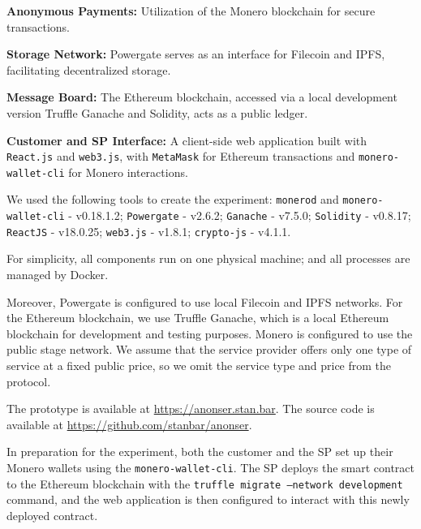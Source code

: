 \documentclass[pdftex,twocolumn,epjc3]{svjour3}
\begin{document}
\begin{itemize}
\begin{sloppypar}
  \item \textbf{Anonymous Payments:} Utilization of the Monero blockchain for secure transactions.
\end{sloppypar}
  \item \textbf{Storage Network:} Powergate serves as an interface for Filecoin and IPFS, facilitating decentralized storage.
  \item \textbf{Message Board:} The Ethereum blockchain, accessed via a local development version Truffle Ganache and Solidity, acts as a public ledger.
  \item \textbf{Customer and SP Interface:} A client-side web application built with \texttt{React.js} and \texttt{web3.js}, with \texttt{MetaMask} for Ethereum transactions and \texttt{monero-wallet-cli} for Monero interactions.
\end{itemize}

We used the following tools to create the experiment:
\texttt{monerod} and \texttt{monero-wallet-cli} - v0.18.1.2; \texttt{Powergate} - v2.6.2; \texttt{Ganache} - v7.5.0; \texttt{Solidity} - v0.8.17; \texttt{ReactJS} - v18.0.25; \texttt{web3.js} - v1.8.1; \texttt{crypto-js} - v4.1.1.

For simplicity, all components run on one physical machine; and all processes are managed by Docker. 

Moreover, Powergate is configured to use local Filecoin and IPFS networks.
For the Ethereum blockchain, we use Truffle Ganache, which is a local Ethereum blockchain for development and testing purposes. 
Monero is configured to use the public stage network.
We assume that the service provider offers only one type of service at a fixed public price, so we omit the service type and price from the protocol.

The prototype is available at \url{https://anonser.stan.bar}. The source code is available at \url{https://github.com/stanbar/anonser}.

\begin{sloppypar}
In preparation for the experiment, both the customer and the SP set up their Monero wallets using the \texttt{monero-wallet-cli}. The SP deploys the smart contract to the Ethereum blockchain with the \texttt{truffle migrate --network development} command, and the web application is then configured to interact with this newly deployed contract.
\end{sloppypar}
\end{document}
